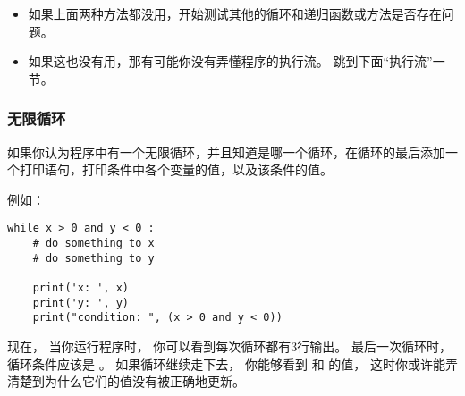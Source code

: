 \begin{itemize}
\item 如果上面两种方法都没用，开始测试其他的循环和递归函数或方法是否存在问题。


\item 如果这也没有用，那有可能你没有弄懂程序的执行流。
跳到下面``执行流''一节。

\end{itemize}

\subsubsection{无限循环}

  
  


如果你认为程序中有一个无限循环，并且知道是哪一个循环，在循环的最后添加一个打印语句，打印条件中各个变量的值，以及该条件的值。


例如：

\begin{lstlisting}
while x > 0 and y < 0 :
    # do something to x
    # do something to y

    print('x: ', x)
    print('y: ', y)
    print("condition: ", (x > 0 and y < 0))
\end{lstlisting}


现在， 当你运行程序时， 你可以看到每次循环都有3行输出。  
最后一次循环时， 循环条件应该是 。  
如果循环继续走下去， 你能够看到  和  的值， 这时你或许能弄清楚到为什么它们的值没有被正确地更新。

